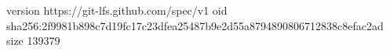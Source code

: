 version https://git-lfs.github.com/spec/v1
oid sha256:2f9981b898c7d19fc17c23dfea25487b9e2d55a8794890806712838c8efac2ad
size 139379
